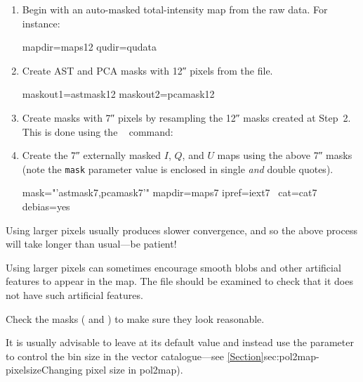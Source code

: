 \begin{enumerate}
\item Begin with an auto-masked total-intensity map from the raw
  data. For instance:

\begin{terminalv}
     mapdir=maps12 qudir=qudata
\end{terminalv}


\item Create AST and PCA masks with 12\si{\arcsecond} pixels from the
   file.


\begin{terminalv}
     maskout1=astmask12 maskout2=pcamask12
\end{terminalv}

\item Create masks with 7\si{\arcsecond} pixels by resampling the
  12\si{\arcsecond} masks created at Step~2. This is done using the
  \Kappa\  command:

\begin{terminalv}
\end{terminalv}

\item Create the 7\si{\arcsecond} externally masked $I$, $Q$, and $U$ maps
  using the above 7\si{\arcsecond} masks (note the \texttt{mask}
  parameter value is enclosed in single \emph{and} double quotes).

\begin{terminalv}
                  mask="'astmask7,pcamask7'" mapdir=maps7 ipref=iext7  \
                  cat=cat7 debias=yes
\end{terminalv}
\end{enumerate}

\begin{tip}
  Using larger pixels usually produces slower convergence, and so the
  above process will take longer than usual---be patient!

  Using larger pixels can sometimes encourage smooth blobs and other
  artificial features to appear in the map. The \file{iauto12.sdf} file
  should be examined to check that it does not have such artificial
  features.

  Check the masks ( and ) to make sure they
  look reasonable.

  It is usually advisable to leave  at its default value
  and instead use the \param{BINSIZE} parameter to control the bin size in
  the vector catalogue---see \cref{Section}{sec:pol2map-pixelsize}{Changing pixel size in pol2map}).
\end{tip}


